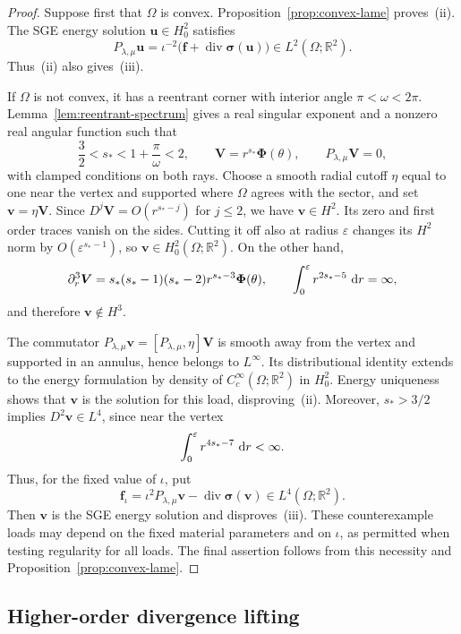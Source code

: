 \documentclass[10pt]{amsart}
\newcommand{\dd}{\,{\rm d}}
\renewcommand{\div}{\operatorname{div}}
\numberwithin{equation}{section}
\begin{document}
\begin{proof}
Suppose first that $\Omega$ is convex. Proposition~\ref{prop:convex-lame} proves~{\rm(ii)}. The SGE energy solution $\boldsymbol u\in H_0^2$ satisfies
\[
P_{\lambda,\mu}\boldsymbol u
=\iota^{-2}\big(\boldsymbol f+\div\boldsymbol\sigma(\boldsymbol u)\big)\in L^2(\Omega;\mathbb R^2).
\]
Thus~{\rm(ii)} also gives~{\rm(iii)}.

If $\Omega$ is not convex, it has a reentrant corner with interior angle $\pi<\omega<2\pi$. Lemma~\ref{lem:reentrant-spectrum} gives a real singular exponent and a nonzero real angular function such that
\[
\frac32<s_\ast<1+\frac{\pi}{\omega}<2,\qquad
\boldsymbol V=r^{s_\ast}\boldsymbol\Phi(\theta),\qquad
P_{\lambda,\mu}\boldsymbol V=0,
\]
with clamped conditions on both rays. Choose a smooth radial cutoff $\eta$ equal to one near the vertex and supported where $\Omega$ agrees with the sector, and set $\boldsymbol v=\eta\boldsymbol V$. Since $D^j\boldsymbol V=O(r^{s_\ast-j})$ for $j\leq2$, we have $\boldsymbol v\in H^2$. Its zero and first order traces vanish on the sides. Cutting it off also at radius $\varepsilon$ changes its $H^2$ norm by $O(\varepsilon^{s_\ast-1})$, so $\boldsymbol v\in H_0^2(\Omega;\mathbb R^2)$. On the other hand,
\[
\partial_r^3\boldsymbol V
=s_\ast(s_\ast-1)(s_\ast-2)r^{s_\ast-3}\boldsymbol\Phi(\theta),
\qquad
\int_0^\varepsilon r^{2s_\ast-5}\,\dd r=\infty,
\]
and therefore $\boldsymbol v\notin H^3$.

The commutator $P_{\lambda,\mu}\boldsymbol v=[P_{\lambda,\mu},\eta]\boldsymbol V$ is smooth away from the vertex and supported in an annulus, hence belongs to $L^\infty$. Its distributional identity extends to the energy formulation by density of $C_c^\infty(\Omega;\mathbb R^2)$ in $H_0^2$. Energy uniqueness shows that $\boldsymbol v$ is the solution for this load, disproving~{\rm(ii)}. Moreover, $s_\ast>3/2$ implies $D^2\boldsymbol v\in L^4$, since near the vertex
\[
\int_0^\varepsilon r^{4s_\ast-7}\,\dd r<\infty.
\]
Thus, for the fixed value of $\iota$, put
\[
\boldsymbol f_\iota
=\iota^2P_{\lambda,\mu}\boldsymbol v-\div\boldsymbol\sigma(\boldsymbol v)
\in L^4(\Omega;\mathbb R^2).
\]
Then $\boldsymbol v$ is the SGE energy solution and disproves~{\rm(iii)}. These counterexample loads may depend on the fixed material parameters and on $\iota$, as permitted when testing regularity for all loads. The final assertion follows from this necessity and Proposition~\ref{prop:convex-lame}.
\end{proof}

\subsection{Higher-order divergence lifting}
\end{document}
